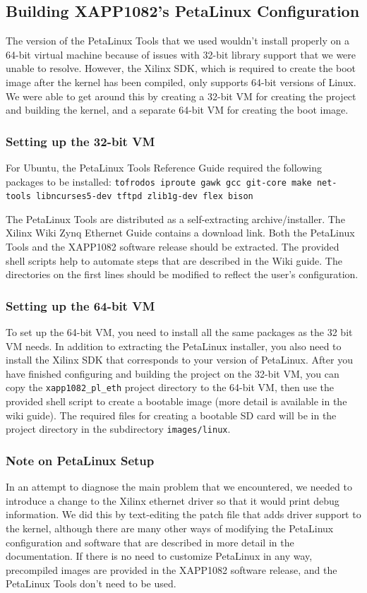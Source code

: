 \documentclass[12pt]{report}
\begin{document}
\subsection{Building XAPP1082's PetaLinux Configuration}
The version of the PetaLinux Tools that we used wouldn't install properly on a 64-bit virtual machine because of issues with 32-bit library support that we were unable to resolve. However, the Xilinx SDK, which is required to create the boot image after the kernel has been compiled, only supports 64-bit versions of Linux. We were able to get around this by creating a 32-bit VM for creating the project and building the kernel, and a separate 64-bit VM for creating the boot image.

\subsubsection{Setting up the 32-bit VM}
For Ubuntu, the PetaLinux Tools Reference Guide required the following packages to be installed:
\newline \texttt{tofrodos iproute gawk gcc git-core make net-tools libncurses5-dev tftpd zlib1g-dev flex bison}

The PetaLinux Tools are distributed as a self-extracting archive/installer. The Xilinx Wiki Zynq Ethernet Guide contains a download link. Both the PetaLinux Tools and the XAPP1082 software release should be extracted. The provided shell scripts help to automate steps that are described in the Wiki guide. The directories on the first lines should be modified to reflect the user's configuration.


\subsubsection{Setting up the 64-bit VM}
To set up the 64-bit VM, you need to install all the same packages as the 32 bit VM needs. In addition to extracting the PetaLinux installer, you also need to install the Xilinx SDK that corresponds to your version of PetaLinux. After you have finished configuring and building the project on the 32-bit VM, you can copy the \texttt{xapp1082\_pl\_eth} project directory to the 64-bit VM, then use the provided shell script to create a bootable image (more detail is available in the wiki guide). The required files for creating a bootable SD card will be in the project directory in the subdirectory \texttt{images/linux}.

\subsubsection{Note on PetaLinux Setup}
In an attempt to diagnose the main problem that we encountered, we needed to introduce a change to the Xilinx ethernet driver so that it would print debug information. We did this by text-editing the patch file that adds driver support to the kernel, although there are many other ways of modifying the PetaLinux configuration and software that are described in more detail in the documentation. If there is no need to customize PetaLinux in any way, precompiled images are provided in the XAPP1082 software release, and the PetaLinux Tools don't need to be used.
\end{document}
